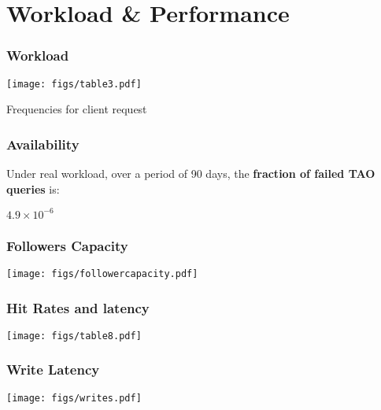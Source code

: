 \section{Workload \& Performance}
\begin{frame}[c]\frametitle{Workload}
\centering
\texttt{[image: figs/table3.pdf]} 

Frequencies for client request



\end{frame}

\begin{frame}[c]\frametitle{Availability}
Under real workload, over a period of 90 days, the \textbf{fraction of failed TAO queries} is:
\begin{center}
	\huge $4.9 \times 10^{-6}$
\end{center}

\end{frame}
\begin{frame}[c]\frametitle{Followers Capacity}
	\centering
    \texttt{[image: figs/followercapacity.pdf]}
\end{frame}

\begin{frame}[c]\frametitle{Hit Rates and latency}
\centering
\texttt{[image: figs/table8.pdf]} 

\end{frame}

\begin{frame}[c]\frametitle{Write Latency}
   	\texttt{[image: figs/writes.pdf]}
\end{frame}


